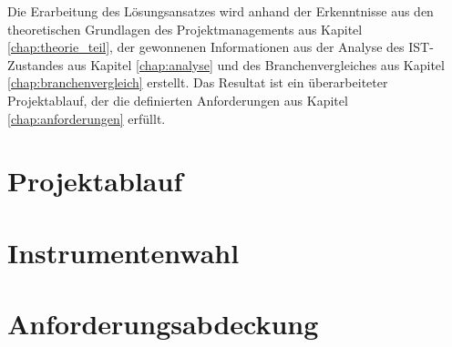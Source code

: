 Die Erarbeitung des Lösungsansatzes wird anhand der Erkenntnisse
aus den theoretischen Grundlagen des Projektmanagements aus Kapitel \ref{chap:theorie_teil},
der gewonnenen Informationen aus der Analyse des IST-Zustandes aus Kapitel \ref{chap:analyse} 
und des Branchenvergleiches aus Kapitel \ref{chap:branchenvergleich} erstellt.
Das Resultat ist ein überarbeiteter Projektablauf, der die definierten Anforderungen 
aus Kapitel \ref{chap:anforderungen} erfüllt.

\section{Projektablauf}


\section{Instrumentenwahl}\label{chap:instrumentenwahl}


\section{Anforderungsabdeckung}

